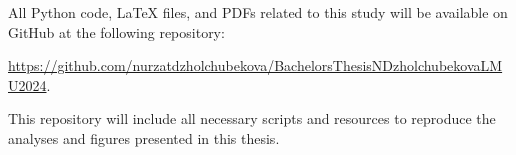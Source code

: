 \documentclass[11pt,a4paper,twoside,openright]{scrbook}
\begin{document}
\listoffigures
\newpage

\listoftables
\newpage

All Python code, LaTeX files, and PDFs related to this study will be available on GitHub at the following repository: 

\vspace{1em}

\url{https://github.com/nurzatdzholchubekova/BachelorsThesisNDzholchubekovaLMU2024}. 

\vspace{1em}

This repository will include all necessary scripts and resources to reproduce the analyses and figures presented in this thesis.
\end{document}
